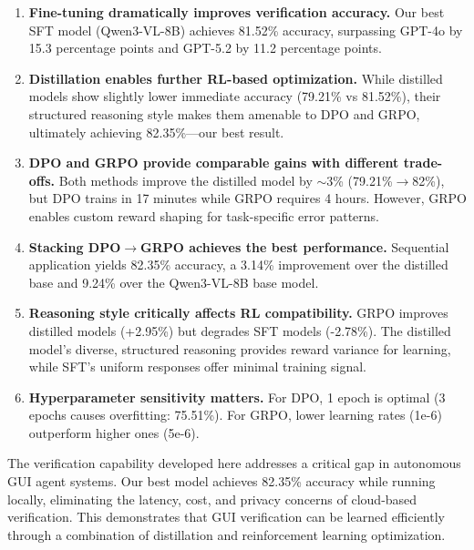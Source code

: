 \documentclass[11pt,a4paper]{article}
\begin{document}
\begin{enumerate}
    \item \textbf{Fine-tuning dramatically improves verification accuracy.} Our best SFT model (Qwen3-VL-8B) achieves 81.52\% accuracy, surpassing GPT-4o by 15.3 percentage points and GPT-5.2 by 11.2 percentage points.
    
    \item \textbf{Distillation enables further RL-based optimization.} While distilled models show slightly lower immediate accuracy (79.21\% vs 81.52\%), their structured reasoning style makes them amenable to DPO and GRPO, ultimately achieving 82.35\%---our best result.
    
    \item \textbf{DPO and GRPO provide comparable gains with different trade-offs.} Both methods improve the distilled model by $\sim$3\% (79.21\%$\rightarrow$82\%), but DPO trains in 17 minutes while GRPO requires 4 hours. However, GRPO enables custom reward shaping for task-specific error patterns.
    
    \item \textbf{Stacking DPO$\rightarrow$GRPO achieves the best performance.} Sequential application yields 82.35\% accuracy, a 3.14\% improvement over the distilled base and 9.24\% over the Qwen3-VL-8B base model.
    
    \item \textbf{Reasoning style critically affects RL compatibility.} GRPO improves distilled models (+2.95\%) but degrades SFT models (-2.78\%). The distilled model's diverse, structured reasoning provides reward variance for learning, while SFT's uniform responses offer minimal training signal.
    
    \item \textbf{Hyperparameter sensitivity matters.} For DPO, 1 epoch is optimal (3 epochs causes overfitting: 75.51\%). For GRPO, lower learning rates (1e-6) outperform higher ones (5e-6).
\end{enumerate}

The verification capability developed here addresses a critical gap in autonomous GUI agent systems. Our best model achieves 82.35\% accuracy while running locally, eliminating the latency, cost, and privacy concerns of cloud-based verification. This demonstrates that GUI verification can be learned efficiently through a combination of distillation and reinforcement learning optimization.


\end{document}
